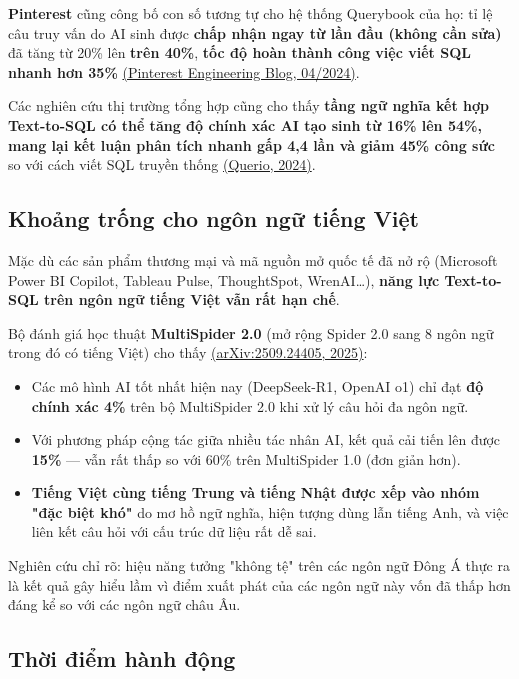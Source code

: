 \documentclass[11pt,a4paper]{article}
\begin{document}
\textbf{Pinterest} cũng công bố con số tương tự cho hệ thống Querybook của họ: tỉ lệ câu truy vấn do AI sinh được \textbf{chấp nhận ngay từ lần đầu (không cần sửa)} đã tăng từ 20\% lên \textbf{trên 40\%}, \textbf{tốc độ hoàn thành công việc viết SQL nhanh hơn 35\%} \href{https://medium.com/pinterest-engineering/how-we-built-text-to-sql-at-pinterest-30bad30dabff}{(Pinterest Engineering Blog, 04/2024)}.

Các nghiên cứu thị trường tổng hợp cũng cho thấy \textbf{tầng ngữ nghĩa kết hợp Text-to-SQL có thể tăng độ chính xác AI tạo sinh từ 16\% lên 54\%, mang lại kết luận phân tích nhanh gấp 4,4 lần và giảm 45\% công sức} so với cách viết SQL truyền thống \href{https://querio.ai/articles/semantic-parsing-for-text-to-sql-in-bi}{(Querio, 2024)}.

\subsection{Khoảng trống cho ngôn ngữ tiếng Việt}

Mặc dù các sản phẩm thương mại và mã nguồn mở quốc tế đã nở rộ (Microsoft Power BI Copilot, Tableau Pulse, ThoughtSpot, WrenAI\ldots), \textbf{năng lực Text-to-SQL trên ngôn ngữ tiếng Việt vẫn rất hạn chế}.

Bộ đánh giá học thuật \textbf{MultiSpider 2.0} (mở rộng Spider 2.0 sang 8 ngôn ngữ trong đó có tiếng Việt) cho thấy \href{https://arxiv.org/html/2509.24405}{(arXiv:2509.24405, 2025)}:

\begin{itemize}
\item Các mô hình AI tốt nhất hiện nay (DeepSeek-R1, OpenAI o1) chỉ đạt \textbf{độ chính xác 4\%} trên bộ MultiSpider 2.0 khi xử lý câu hỏi đa ngôn ngữ.
\item Với phương pháp cộng tác giữa nhiều tác nhân AI, kết quả cải tiến lên được \textbf{15\%} --- vẫn rất thấp so với 60\% trên MultiSpider 1.0 (đơn giản hơn).
\item \textbf{Tiếng Việt cùng tiếng Trung và tiếng Nhật được xếp vào nhóm "đặc biệt khó"} do mơ hồ ngữ nghĩa, hiện tượng dùng lẫn tiếng Anh, và việc liên kết câu hỏi với cấu trúc dữ liệu rất dễ sai.
\end{itemize}

Nghiên cứu chỉ rõ: hiệu năng tưởng "không tệ" trên các ngôn ngữ Đông Á thực ra là kết quả gây hiểu lầm vì điểm xuất phát của các ngôn ngữ này vốn đã thấp hơn đáng kể so với các ngôn ngữ châu Âu.

\subsection{Thời điểm hành động}
\end{document}
